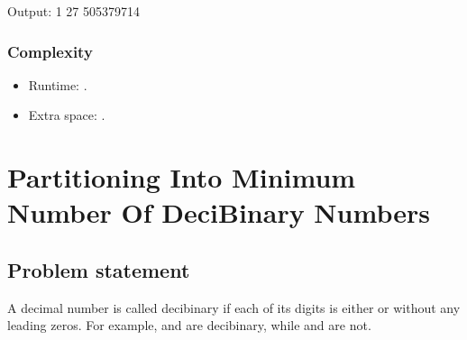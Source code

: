 \documentclass[letterpaper,12pt,english]{book}
\begin{document}
\begin{sphinxVerbatim}[commandchars=\\\{\}]
Output:
1
27
505379714
\end{sphinxVerbatim}


\subsubsection{Complexity}
\label{\detokenize{Mathematics/09_MTH_1680_Concatenation_of_Consecutive_Binary_Numbers:complexity}}\begin{itemize}
\item {} 
\sphinxAtStartPar
Runtime: .

\item {} 
\sphinxAtStartPar
Extra space: .

\end{itemize}

\sphinxstepscope


\section{Partitioning Into Minimum Number Of Deci\sphinxhyphen{}Binary Numbers}
\label{\detokenize{Mathematics/09_MTH_1689_Partitioning_Into_Minimum_Number_Of_Deci-Binary_Numbers:partitioning-into-minimum-number-of-deci-binary-numbers}}\label{\detokenize{Mathematics/09_MTH_1689_Partitioning_Into_Minimum_Number_Of_Deci-Binary_Numbers::doc}}

\subsection{Problem statement\sphinxfootnotemark[115]}
\label{\detokenize{Mathematics/09_MTH_1689_Partitioning_Into_Minimum_Number_Of_Deci-Binary_Numbers:problem-statement}}%
\begin{footnotetext}[115]\sphinxAtStartFootnote
{}
%
\end{footnotetext}\ignorespaces 
\sphinxAtStartPar
A decimal number is called deci\sphinxhyphen{}binary if each of its digits is either  or  without any leading zeros. For example,  and  are deci\sphinxhyphen{}binary, while  and  are not.
\end{document}
